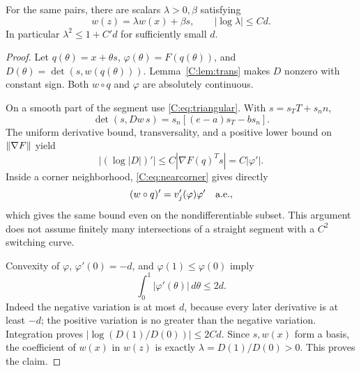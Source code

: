 \begin{lemma}\label{C:lem:transport}
For the same pairs, there are scalars $\lambda>0,\beta$ satisfying
\begin{equation}\label{C:eq:transport}
 w(z)=\lambda w(x)+\beta s,\qquad
 |\log\lambda|\le C d.
\end{equation}
In particular $\lambda^2\le1+C'd$ for sufficiently small $d$.
\end{lemma}
\begin{proof}
Let $q(\theta)=x+\theta s$, $\varphi(\theta)=F(q(\theta))$, and $D(\theta)=\det(s,w(q(\theta)))$. Lemma~\ref{C:lem:trans} makes $D$ nonzero with constant sign. Both $w\circ q$ and $\varphi$ are absolutely continuous.

On a smooth part of the segment use \eqref{C:eq:triangular}. With $s=s_TT+s_n n$,
\[
 \det(s,Dw\,s)=s_n[(e-a)s_T-bs_n].
\]
The uniform derivative bound, transversality, and a positive lower bound on $\lVert \nabla F\rVert$ yield
\[
 |(\log|D|)'|\le C|\nabla F(q)^Ts|=C|\varphi'|.
\]
Inside a corner neighborhood, \eqref{C:eq:nearcorner} gives directly
\[
 (w\circ q)'=v_j'(\varphi)\varphi'\quad\hbox{a.e.},
\]
which gives the same bound even on the nondifferentiable subset. This argument does not assume finitely many intersections of a straight segment with a $C^2$ switching curve.

Convexity of $\varphi$, $\varphi'(0)=-d$, and $\varphi(1)\le\varphi(0)$ imply
\begin{equation}\label{C:eq:variation}
 \int_0^1|\varphi'(\theta)|\,d\theta\le2d.
\end{equation}
Indeed the negative variation is at most $d$, because every later derivative is at least $-d$; the positive variation is no greater than the negative variation. Integration proves $|\log(D(1)/D(0))|\le2Cd$. Since $s,w(x)$ form a basis, the coefficient of $w(x)$ in $w(z)$ is exactly $\lambda=D(1)/D(0)>0$. This proves the claim.
\end{proof}

